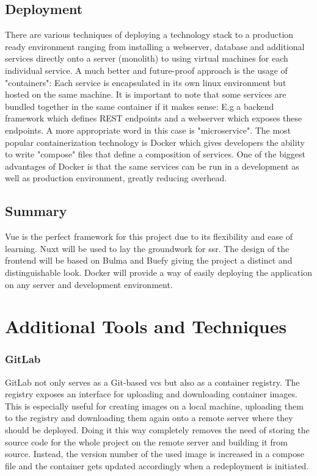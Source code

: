 \subsection{Deployment}
There are various techniques of deploying a technology stack to a production ready environment ranging from installing a webserver, database and additional services directly onto a server (monolith) to using virtual machines for each individual service. A much better and future-proof approach is the usage of "containers": Each service is encapsulated in its own linux environment but hosted on the same machine. It is important to note that some services are bundled together in the same container if it makes sense: E.g a backend framework which defines REST endpoints and a webserver which exposes these endpoints. A more appropriate word in this case is "microservice". The most popular containerization technology is Docker which gives developers the ability to write "compose" files that define a composition of services. One of the biggest advantages of Docker is that the same services can be run in a development as well as production environment, greatly reducing overhead.

\subsection{Summary}
Vue is the perfect framework for this project due to its flexibility and ease of learning. Nuxt will be used to lay the groundwork for \acrshort{ssr}. The design of the frontend will be based on Bulma and Buefy giving the project a distinct and distinguishable look. Docker will provide a way of easily deploying the application on any server and development environment.

\section{Additional Tools and Techniques}
\subsubsection{GitLab}
GitLab not only serves as a Git-based \acrfull{vcs} but also as a container registry. The registry exposes an interface for uploading and downloading container images. This is especially useful for creating images on a local machine, uploading them to the registry and downloading them again onto a remote server where they should be deployed. Doing it this way completely removes the need of storing the source code for the whole project on the remote server and building it from source. Instead, the version number of the used image is increased in a compose file and the container gets updated accordingly when a redeployment is initiated.

